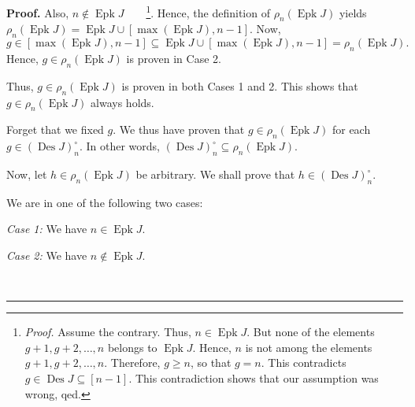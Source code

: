 \documentclass[numbers=enddot,12pt,final,onecolumn,notitlepage]{scrartcl}%
\theoremstyle{definition}
\newenvironment{proof}[1][Proof]{\noindent\textbf{#1.} }{\ \rule{0.5em}{0.5em}}
\begin{document}
\begin{proof}
Also, $n\notin\operatorname*{Epk}J$\ \ \ \ \footnote{\textit{Proof.} Assume
the contrary. Thus, $n\in\operatorname*{Epk}J$. But none of the elements
$g+1,g+2,\ldots,n$ belongs to $\operatorname*{Epk}J$. Hence, $n$ is not among
the elements $g+1,g+2,\ldots,n$. Therefore, $g\geq n$, so that $g=n$. This
contradicts $g\in\operatorname*{Des}J\subseteq\left[  n-1\right]  $. This
contradiction shows that our assumption was wrong, qed.}. Hence, the
definition of $\rho_{n}\left(  \operatorname*{Epk}J\right)  $ yields $\rho
_{n}\left(  \operatorname*{Epk}J\right)  =\operatorname*{Epk}J\cup\left[
\max\left(  \operatorname*{Epk}J\right)  ,n-1\right]  $. Now,%
\[
g\in\left[  \max\left(  \operatorname*{Epk}J\right)  ,n-1\right]
\subseteq\operatorname*{Epk}J\cup\left[  \max\left(  \operatorname*{Epk}%
J\right)  ,n-1\right]  =\rho_{n}\left(  \operatorname*{Epk}J\right)  .
\]
Hence, $g\in\rho_{n}\left(  \operatorname*{Epk}J\right)  $ is proven in Case 2.

Thus, $g\in\rho_{n}\left(  \operatorname*{Epk}J\right)  $ is proven in both
Cases 1 and 2. This shows that $g\in\rho_{n}\left(  \operatorname*{Epk}%
J\right)  $ always holds.

Forget that we fixed $g$. We thus have proven that $g\in\rho_{n}\left(
\operatorname*{Epk}J\right)  $ for each $g\in\left(  \operatorname*{Des}%
J\right)  _{n}^{\circ}$. In other words, $\left(  \operatorname*{Des}J\right)
_{n}^{\circ}\subseteq\rho_{n}\left(  \operatorname*{Epk}J\right)  $.

Now, let $h\in\rho_{n}\left(  \operatorname*{Epk}J\right)  $ be arbitrary. We
shall prove that $h\in\left(  \operatorname*{Des}J\right)  _{n}^{\circ}$.

We are in one of the following two cases:

\textit{Case 1:} We have $n\in\operatorname*{Epk}J$.

\textit{Case 2:} We have $n\notin\operatorname*{Epk}J$.


\end{proof}
\end{document}
